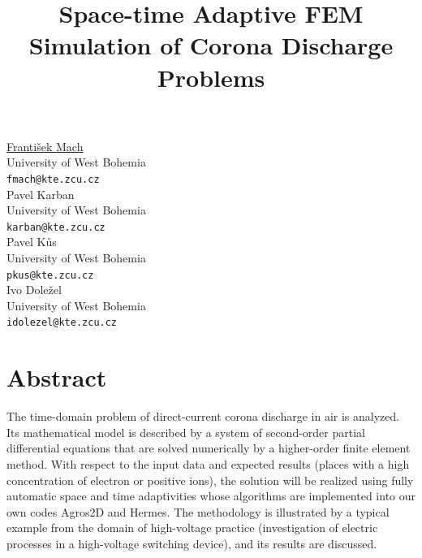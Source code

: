 \documentclass[article, A4, 11pt]{llncs}%
\begin{document}
\title{Space-time Adaptive FEM Simulation of Corona Discharge Problems}
 \author{} \institute{}
\maketitle
\begin{center}
{\large \underline{Franti\v{s}ek Mach}}\\
University of West Bohemia\\
{\tt fmach@kte.zcu.cz}
\\ \vspace{4mm}
{\large Pavel Karban}\\
University of West Bohemia\\
{\tt karban@kte.zcu.cz}
\\ \vspace{4mm}
{\large Pavel K\r{u}s}\\
University of West Bohemia\\
{\tt pkus@kte.zcu.cz}
\\ \vspace{4mm}
{\large Ivo Dole\v{z}el}\\
University of West Bohemia\\
{\tt idolezel@kte.zcu.cz}
\end{center}

\section*{Abstract}
The time-domain problem of direct-current corona discharge in air is analyzed. Its mathematical model is described by a system of second-order partial differential equations that are solved numerically by a higher-order finite element method. With respect to the input data and expected results (places with a high concentration of electron or positive ions), the solution will be realized using fully automatic space and time adaptivities whose algorithms are implemented into our own codes Agros2D and Hermes. The methodology is illustrated by a typical example from the domain of high-voltage practice (investigation of electric processes in a high-voltage switching device), and its results are discussed.
\end{document}
